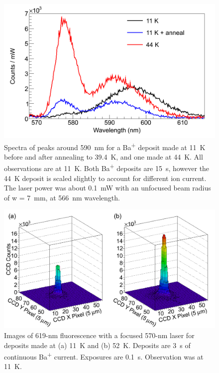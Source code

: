 \begin{figure} %
        \centering
                \includegraphics[width=.7\textwidth]{figures/spectra_temperature_conditions.png}
                \caption{Spectra of peaks around 590~nm for a Ba\textsuperscript{+} deposit made at 11~K before and after annealing to 39.4~K, and one made at 44~K.  All observations are at 11~K.  Both Ba\textsuperscript{+} deposits are 15~s, however the 44~K deposit is scaled slightly to account for different ion current.  The laser power was about 0.1~mW with an unfocused beam radius of w = 7~mm, at 566~nm wavelength.}
\label{fig:specTempConditions}
\end{figure}

\begin{figure} [h]
        \centering
                \includegraphics[width=.8\textwidth]{figures/619_deposit_temp.png}
                \caption{Images of 619-nm fluorescence with a focused 570-nm laser for deposits made at (a) 11~K and (b) 52~K.  Deposits are 3~s of continuous Ba\textsuperscript{+} current.  Exposures are 0.1~s.  Observation was at 11~K.}
\label{fig:specTempConditions619}
\end{figure}

